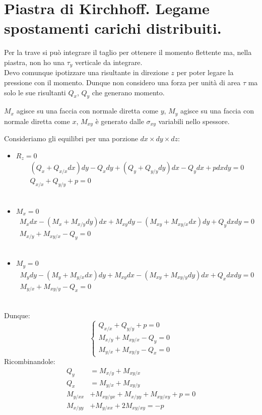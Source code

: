 \section{Piastra di Kirchhoff. Legame spostamenti carichi distribuiti.}


Per la trave si può integrare il taglio per ottenere il momento flettente ma, nella piastra, non ho una $\tau_y$ verticale da integrare.\\
Devo comunque ipotizzare una risultante in direzione $ z$ per poter legare la pressione con il momento. Dunque non considero una forza per unità di area $\tau$ ma solo le sue risultanti $Q_x$, $Q_y$ che generano momento.

$M_x$ agisce su una faccia con normale diretta come $y$,  $M_y$ agisce su una faccia con normale diretta come $x$, $M_{xy}$ è generato dalle $\sigma_{xy}$ variabili nello spessore.

Consideriamo gli equilibri per una porzione $dx\times dy \times dz$:
\begin{itemize}
    \item $R_z=0$
    \begin{align*}
        (Q_x+Q_{x/x}dx)dy-Q_xdy + (Q_y+Q_{y/y}dy)dx-Q_ydx + pdxdy=0\\
        Q_{x/x}+Q_{y/y}+p=0
    \end{align*}        \\
    
      \item $M_x=0$
    \begin{align*}
       M_xdx- (M_x+M_{x/y}dy)dx + M_{xy}dy- (M_{xy}+M_{xy/x}dx)dy + Q_ydxdy=0\\
       M_{x/y}+M_{xy/x}-Q_y=0
    \end{align*}        \\

     \item $M_y=0$
    \begin{align*}
       M_ydy- (M_y+M_{y/x}dx)dy + M_{xy}dx- (M_{xy}+M_{xy/y}dy)dx + Q_xdxdy=0\\
       M_{y/x}+M_{xy/y}-Q_x=0
    \end{align*}        \\
\end{itemize}

Dunque:
\begin{equation*}
    \begin{cases}
         Q_{x/x}+Q_{y/y}+p=0\\ M_{x/y}+M_{xy/x}-Q_y=0\\ M_{y/x}+M_{xy/y}-Q_x=0
    \end{cases}
\end{equation*}
Ricombinandole:
\begin{align*}
    Q_y&=M_{x/y}+M_{xy/x}\\
    Q_x&=M_{y/x}+M_{xy/y}\\
    M_{y/xx}&+M_{xy/yx}+M_{x/yy}+M_{xy/xy}+p=0\\
    M_{x/yy}&+M_{y/xx}+2M_{xy/xy}=-p\\
\end{align*}

